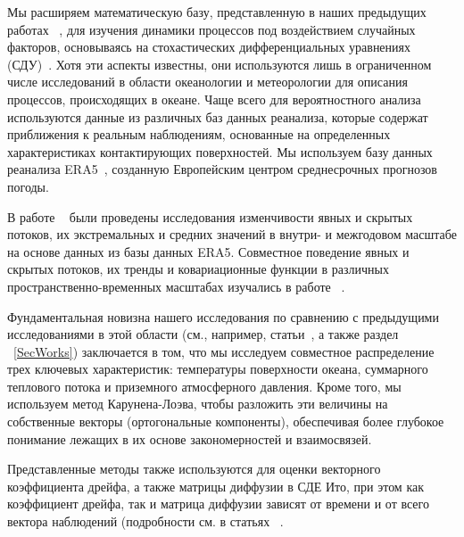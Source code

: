 Мы расширяем математическую базу, представленную в наших предыдущих работах ~\cite{Belyaev2021,FAO, Gorshenin2023}, для изучения динамики процессов под воздействием случайных факторов, основываясь на стохастических дифференциальных уравнениях (СДУ)~\cite{Skorohod}. Хотя эти аспекты известны, они используются лишь в ограниченном числе исследований в области океанологии и метеорологии для описания процессов, происходящих в океане. Чаще всего для вероятностного анализа используются данные из различных баз данных реанализа, которые содержат приближения к реальным наблюдениям, основанные на определенных характеристиках контактирующих поверхностей.
Мы используем базу данных реанализа ERA5~\cite{hersbach2020era5}, созданную Европейским центром среднесрочных прогнозов погоды.

В работе ~\cite{van2021characterisation} были проведены исследования изменчивости явных и скрытых потоков, их экстремальных и средних значений в внутри- и межгодовом масштабе на основе данных из базы данных ERA5. Совместное поведение явных и скрытых потоков, их тренды и ковариационные функции в различных пространственно-временных масштабах изучались в работе ~\cite{toppaladoddi2021stochastic}.

Фундаментальная новизна нашего исследования по сравнению с предыдущими исследованиями в этой области (см., например, статьи~\cite{van2021 characterization,toppaladoddi2021stochastic}, а также раздел ~\ref{SecWorks}) заключается в том, что мы исследуем совместное распределение трех ключевых характеристик: температуры поверхности океана, суммарного теплового потока и приземного атмосферного давления.
Кроме того, мы используем метод Карунена-Лоэва, чтобы разложить эти величины на собственные векторы (ортогональные компоненты), обеспечивая более глубокое понимание лежащих в их основе закономерностей и взаимосвязей.

Представленные методы также используются для оценки векторного коэффициента дрейфа, а также матрицы диффузии в СДЕ Ито, при этом как коэффициент дрейфа, так и матрица диффузии зависят от времени и от всего вектора наблюдений (подробности см. в статьях ~\cite{Gorshenin2023,belyaev2024comparison}.





